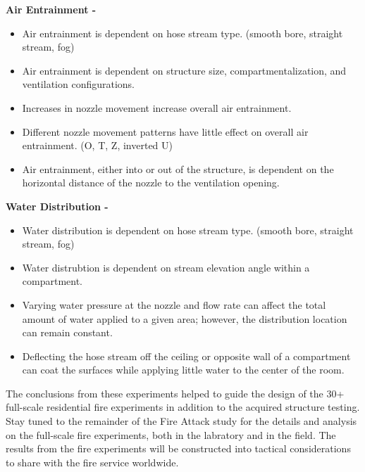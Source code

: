 \documentclass{article}
\begin{document}
\vspace*{\baselineskip}
\noindent \bf{Air Entrainment} -
\normalfont
\begin{itemize}
	\item Air entrainment is dependent on hose stream type. (smooth bore, straight stream, fog)
	\item Air entrainment is dependent on structure size, compartmentalization, and ventilation configurations.
	\item Increases in nozzle movement increase overall air entrainment.
	\item Different nozzle movement patterns have little effect on overall air entrainment. (O, T, Z, inverted U)
	\item Air entrainment, either into or out of the structure, is dependent on the horizontal distance of the nozzle to the ventilation opening.
	\end{itemize}
\vspace*{\baselineskip}
\noindent \bf{Water Distribution} -
\normalfont
\begin{itemize}
	\item Water distribution is dependent on hose stream type. (smooth bore, straight stream, fog)
	\item Water distrubtion is dependent on stream elevation angle within a compartment.
	\item Varying water pressure at the nozzle and flow rate can affect the total amount of water applied to a given area; however, the distribution location can remain constant.
	\item Deflecting the hose stream off the ceiling or opposite wall of a compartment can coat the surfaces while applying little water to the center of the room.
	\end{itemize}
\vspace*{\baselineskip}

The conclusions from these experiments helped to guide the design of the 30+ full-scale residential fire experiments in addition to the acquired structure testing. Stay tuned to the remainder of the Fire Attack study for the details and analysis on the full-scale fire experiments, both in the labratory and in the field. The results from the fire experiments will be constructed into tactical considerations to share with the fire service worldwide.

\clearpage

\end{document}
